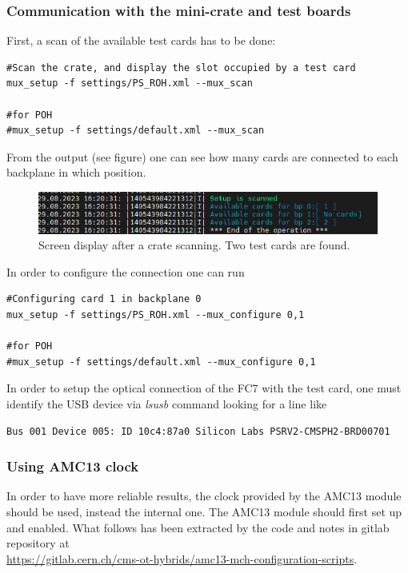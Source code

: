 \documentclass[10pt,a4paper]{article}
\begin{document}
\subsubsection{Communication with the mini-crate and test boards}
First, a scan of the available test cards has to be done:
\begin{framed}
\begin{verbatim}
#Scan the crate, and display the slot occupied by a test card
mux_setup -f settings/PS_ROH.xml --mux_scan

#for POH
#mux_setup -f settings/default.xml --mux_scan 
\end{verbatim}
\end{framed}
From the output (see figure) one can see how many cards are connected to each backplane in which position.
\begin{figure}[h!]
\centering
 \includegraphics[width=\linewidth]{mux_scan.png} 
  \caption{Screen display after a crate scanning. Two test cards are found.}
\end{figure}
In order to configure the connection one can run 
\begin{framed}
\begin{verbatim}
#Configuring card 1 in backplane 0
mux_setup -f settings/PS_ROH.xml --mux_configure 0,1

#for POH
#mux_setup -f settings/default.xml --mux_configure 0,1
\end{verbatim}
\end{framed}
In order to setup the optical connection of the FC7 with the test card, one must identify the USB device via {\it lsusb} command looking for a line like
\begin{framed}
\begin{verbatim}
Bus 001 Device 005: ID 10c4:87a0 Silicon Labs PSRV2-CMSPH2-BRD00701 
\end{verbatim}
\end{framed}


\subsubsection{Using AMC13 clock}
In order to have more reliable results, the clock provided by the AMC13 module should be used, instead the internal one.
The AMC13 module should first set up and enabled. What follows has been extracted by the code and notes in gitlab repository at\\ \url{https://gitlab.cern.ch/cms-ot-hybrids/amc13-mch-configuration-scripts}.
\end{document}
